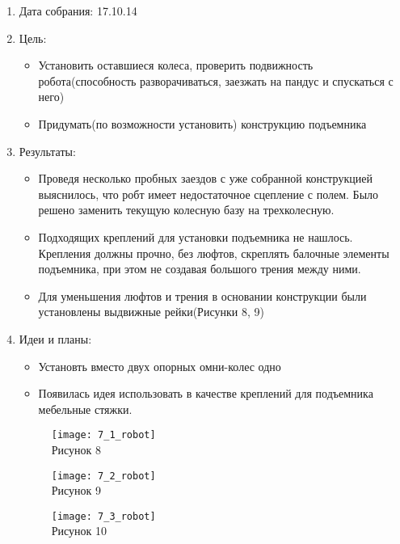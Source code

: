 \documentclass[11pt]{article}
\begin{document}
	\begin{enumerate}
	\item Дата собрания: 17.10.14
	\item Цель:
		\begin{itemize}
		\item Установить оставшиеся колеса, проверить подвижность робота(способность разворачиваться, заезжать на пандус и спускаться с него)
		\item Придумать(по возможности установить) конструкцию подъемника
		\end{itemize}
	\item Результаты:
		\begin{itemize}
		\item Проведя несколько пробных заездов с уже собранной конструкцией выяснилось, что робт имеет недостаточное сцепление с полем. Было решено заменить текущую колесную базу на трехколесную.
		\item Подходящих креплений для установки подъемника не нашлось. Крепления должны прочно, без люфтов, скреплять балочные элементы подъемника, при этом не создавая большого трения между ними.
		\item Для уменьшения люфтов и трения в основании конструкции были установлены выдвижные рейки(Рисунки 8, 9)
		\end{itemize}
	\item Идеи и планы:
		\begin{itemize}
		\item Установть вместо двух опорных омни-колес одно
		\item Появилась идея использовать в качестве креплений для подъемника мебельные стяжки.
		\end{itemize}
	\begin{figure} [h]
			\centering
			\begin{minipage}{0.3\linewidth}
				\texttt{[image: 7\_1\_robot]}\\ Рисунок 8
			\end{minipage}
			\begin{minipage}{0.3\linewidth}
				\texttt{[image: 7\_2\_robot]}\\ Рисунок 9
			\end{minipage}
			\begin{minipage}{0.3\linewidth}
				\texttt{[image: 7\_3\_robot]}\\ Рисунок 10
			\end{minipage}		
	\end{figure}
	\end{enumerate}
\end{document}
